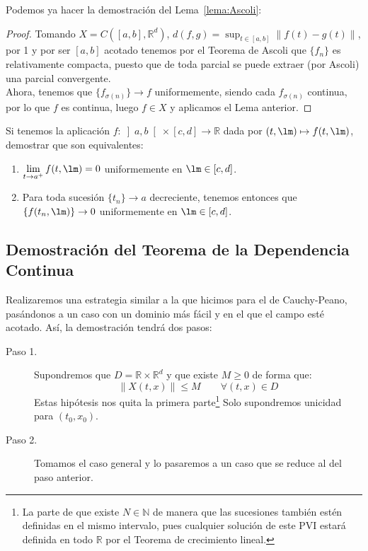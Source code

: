 \noindent
Podemos ya hacer la demostración del Lema~\ref{lema:Ascoli}:
\begin{proof}
    Tomando $X=C([a,b],\mathbb{R}^d)$, $d(f,g) = \sup_{t\in [a,b]}\|f(t)-g(t)\|$, por 1 y por ser $[a,b]$ acotado tenemos por el Teorema de Ascoli que $\{f_n\}$ es relativamente compacta, puesto que de toda parcial se puede extraer (por Ascoli) una parcial convergente.\\

    \noindent
    Ahora, tenemos que $\{f_{\sigma(n)}\}\to f$ uniformemente, siendo cada $f_{\sigma(n)}$ continua, por lo que $f$ es continua, luego $f\in X$ y aplicamos el Lema anterior.
\end{proof}

\begin{ejercicio}
    Si tenemos la aplicación $f:\left]a,b\right[\times [c,d]\to \mathbb{R}$ dada por $(t,\lm)\mapsto f(t,\lm)$, demostrar que son equivalentes:
    \begin{enumerate}
        \item $\lim\limits_{t\to a^+}f(t,\lm) = 0$ uniformemente en $\lm \in [c,d]$.
        \item Para toda sucesión $\{t_n\}\to a$ decreciente, tenemos entonces que $\{f(t_n,\lm)\}\to 0$ uniformemente en $\lm \in [c,d]$.
    \end{enumerate}
\end{ejercicio}

\subsection{Demostración del Teorema de la Dependencia Continua}
\noindent
Realizaremos una estrategia similar a la que hicimos para el de Cauchy-Peano, pasándonos a un caso con un dominio más fácil y en el que el campo esté acotado. Así, la demostración tendrá dos pasos:
\begin{description}
    \item [Paso 1.] Supondremos que $D=\mathbb{R}\times \mathbb{R}^d$ y que existe $M\geq 0$ de forma que:
        \begin{equation*}
            \|X(t,x)\|\leq M \qquad \forall (t,x)\in D
        \end{equation*}
        Estas hipótesis nos quita la primera parte\footnote{La parte de que existe $N\in \mathbb{N}$ de manera que las sucesiones también estén definidas en el mismo intervalo, pues cualquier solución de este PVI estará definida en todo $\mathbb{R}$ por el Teorema de crecimiento lineal.} Solo supondremos unicidad para $(t_0,x_0)$.
    \item [Paso 2.] Tomamos el caso general y lo pasaremos a un caso que se reduce al del paso anterior.
\end{description}

